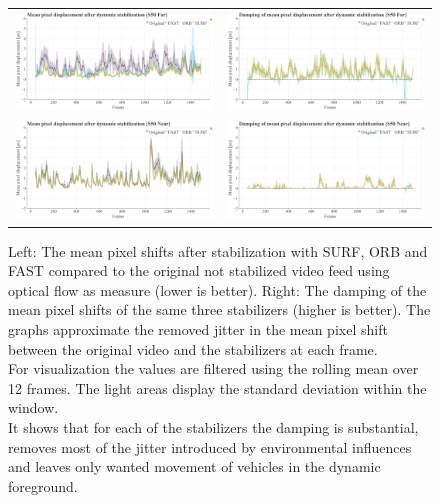 \begin{figure}[!ht]
\begin{tabular}{cc}
      \includegraphics[width=0.475\linewidth]{diagrams/optical_flow/s50_s_far_image_raw.mp4.csv/compare_of_mean_pixel_displacement/window_size_12.html.png}    & 
      \includegraphics[width=0.475\linewidth]{diagrams/optical_flow/s50_s_far_image_raw.mp4.csv/deltas_of_mean_pixel_displacement/window_size_12.html.png}   \\ 

      \includegraphics[width=0.475\linewidth]{diagrams/optical_flow/s50_s_near_image_raw.mp4.csv/compare_of_mean_pixel_displacement/window_size_12.html.png}    &   
      \includegraphics[width=0.475\linewidth]{diagrams/optical_flow/s50_s_near_image_raw.mp4.csv/deltas_of_mean_pixel_displacement/window_size_12.html.png}   \\ 
    \end{tabular}
    \caption{
        Left: 
        The mean pixel shifts after stabilization with SURF, ORB and FAST compared to the original not stabilized video feed using optical flow as measure (lower is better).
        Right: 
        The damping of the mean pixel shifts of the same three stabilizers (higher is better). 
        The graphs approximate the removed jitter in the mean pixel shift between the original video and the stabilizers at each frame.\\
        For visualization the values are filtered using the rolling mean over 12 frames. 
        The light areas display the standard deviation within the window. \\
        It shows that for each of the stabilizers the damping is substantial, removes most of the jitter introduced by environmental influences and leaves only wanted movement of vehicles in the dynamic foreground.
    }
    \label{fig:dynamic_stabilization_appendix}
    \end{figure}

